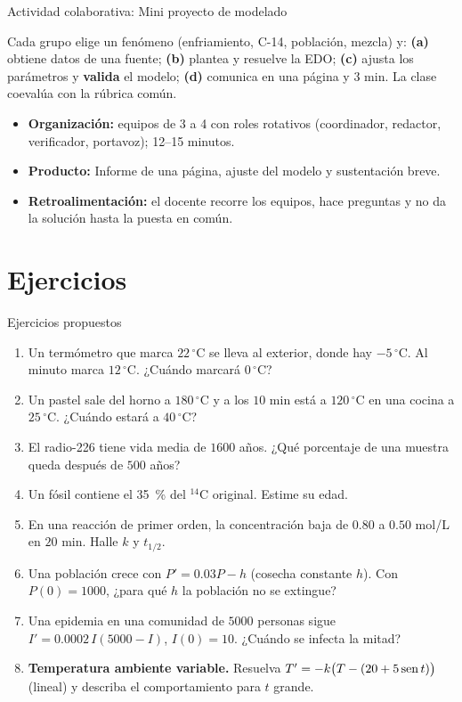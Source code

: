 \documentclass[10pt,aspectratio=169]{beamer}
\begin{document}
\begin{frame}{Actividad colaborativa: Mini proyecto de modelado}
  \small
  \begin{activa}
    Cada grupo elige un fenómeno (enfriamiento, C-14, población, mezcla) y: \textbf{(a)} obtiene datos de una fuente; \textbf{(b)} plantea y resuelve la EDO; \textbf{(c)} ajusta los parámetros y \textbf{valida} el modelo; \textbf{(d)} comunica en una página y 3 min. La clase coevalúa con la rúbrica común.
  \end{activa}
  \begin{itemize}
    \item \textbf{Organización:} equipos de 3 a 4 con roles rotativos (coordinador, redactor, verificador, portavoz); 12--15 minutos.
    \item \textbf{Producto:} Informe de una página, ajuste del modelo y sustentación breve.
    \item \textbf{Retroalimentación:} el docente recorre los equipos, hace preguntas y no da la solución hasta la puesta en común.
  \end{itemize}
\end{frame}

\section{Ejercicios}

\begin{frame}{Ejercicios propuestos}
  \small
  \begin{ejercicio}
    \begin{enumerate}
      \item Un termómetro que marca $22\,^\circ$C se lleva al exterior, donde hay $-5\,^\circ$C. Al minuto marca $12\,^\circ$C. ¿Cuándo marcará $0\,^\circ$C?
      \item Un pastel sale del horno a $180\,^\circ$C y a los $10$ min está a $120\,^\circ$C en una cocina a $25\,^\circ$C. ¿Cuándo estará a $40\,^\circ$C?
      \item El radio-226 tiene vida media de $1600$ años. ¿Qué porcentaje de una muestra queda después de $500$ años?
      \item Un fósil contiene el 35~\% del $^{14}$C original. Estime su edad.
      \item En una reacción de primer orden, la concentración baja de $0.80$ a $0.50$ mol/L en $20$ min. Halle $k$ y $t_{1/2}$.
      \item Una población crece con $P'=0.03P-h$ (cosecha constante $h$). Con $P(0)=1000$, ¿para qué $h$ la población no se extingue?
      \item Una epidemia en una comunidad de $5000$ personas sigue $I'=0.0002\,I(5000-I)$, $I(0)=10$. ¿Cuándo se infecta la mitad?
      \item \textbf{Temperatura ambiente variable.} Resuelva $T'=-k\big(T-(20+5\operatorname{sen} t)\big)$ (lineal) y describa el comportamiento para $t$ grande.
    \end{enumerate}
  \end{ejercicio}
\end{frame}
\end{document}
